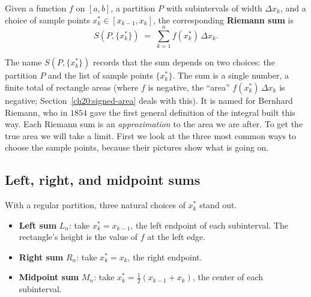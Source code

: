 \begin{definition}
\label{ch20:def-riemann-sum}
Given a function $f$ on $[a,b]$, a partition $P$ with subintervals of width
$\Delta x_k$, and a choice of sample points $x_k^\ast \in [x_{k-1},x_k]$, the
corresponding \textbf{Riemann sum} is
\[
  S(P, \{x_k^\ast\}) \;=\; \sum_{k=1}^{n} f(x_k^\ast)\,\Delta x_k.
\]
\end{definition}

The name $S(P, \{x_k^\ast\})$ records that the sum depends on two choices: the
partition $P$ and the list of sample points $\{x_k^\ast\}$. The sum is a single
number, a finite total of rectangle areas (where $f$ is negative, the
``area'' $f(x_k^\ast)\,\Delta x_k$ is negative; Section~\ref{ch20:signed-area}
deals with this). It is named for Bernhard Riemann, who in $1854$ gave the first
general definition of the integral built this way. Each Riemann sum is
an \emph{approximation} to the area we are after. To get the true area we will
take a limit. First we look at the three most common ways to choose the
sample points, because their pictures show what is going on.

\subsection{Left, right, and midpoint sums}
\label{ch20:lrm}

With a regular partition, three natural choices of $x_k^\ast$ stand out.

\begin{itemize}
\item \textbf{Left sum} $L_n$: take $x_k^\ast = x_{k-1}$, the left endpoint of
each subinterval. The rectangle's height is the value of $f$ at the left edge.
\item \textbf{Right sum} $R_n$: take $x_k^\ast = x_k$, the right endpoint.
\item \textbf{Midpoint sum} $M_n$: take $x_k^\ast = \tfrac{1}{2}(x_{k-1}+x_k)$,
the center of each subinterval.
\end{itemize}

